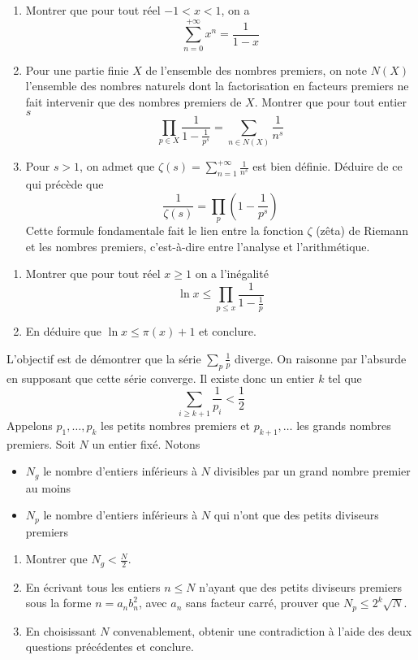 \begin{exo}
\begin{enumerate}
\item Montrer que pour tout réel $-1 < x < 1$, on a
$$\displaystyle\sum_{n=0}^{+\infty} x^n = \frac{1}{1-x}$$
\item Pour une partie finie $X$ de l'ensemble des nombres premiers, on note $N(X)$ l'ensemble des nombres naturels dont la factorisation en facteurs premiers ne fait intervenir que des nombres premiers de $X$. Montrer que pour tout entier $s$
$$\prod_{p \in X} \frac{1}{1-\frac{1}{p^s}} = \sum_{n \in N(X)} \frac{1}{n^s}$$
\item Pour $s > 1$, on admet que $\zeta(s) = \displaystyle\sum_{n=1}^{+\infty} \frac{1}{n^s}$ est bien définie. Déduire de ce qui précède que
$$\frac{1}{\zeta(s)} = \prod_{p} \left(1-\frac{1}{p^s}\right)$$
Cette formule fondamentale fait le lien entre la fonction $\zeta$ (\og zêta\fg{}) de Riemann et les nombres premiers, c'est-à-dire entre l'analyse et l'arithmétique.
\end{enumerate}
\end{exo}


\begin{exo}
\begin{enumerate}
\item Montrer que pour tout réel $x \geq 1$ on a l'inégalité
$$\ln x \leq \prod_{p \leq x} \frac{1}{1-\frac{1}{p}}$$
\item En déduire que $\ln x \leq \pi(x) + 1$ et conclure.
\end{enumerate}
\end{exo}


\begin{exo}[dû à Erd\H{o}]
L'objectif est de démontrer que la série $\displaystyle\sum_{p} \frac{1}{p}$ diverge. On raisonne par l'absurde en supposant que cette série converge. Il existe donc un entier $k$ tel que
\[ \sum_{i \geq k+1} \frac{1}{p_i} < \frac{1}{2} \]
Appelons $p_1, \dots, p_k$ les \og petits \fg{} nombres premiers et $p_{k+1}, \dots$ les \og grands \fg{} nombres premiers. Soit $N$ un entier fixé. Notons
\begin{itemize}
	\item $N_g$ le nombre d'entiers inférieurs à $N$ divisibles par un grand nombre premier au moins
	\item $N_p$ le nombre d'entiers inférieurs à $N$ qui n'ont que des petits diviseurs premiers
\end{itemize}
\begin{enumerate}
	\item Montrer que $N_g < \frac{N}{2}$.
	\item En écrivant tous les entiers $n \leq N$ n'ayant que des petits diviseurs premiers sous la forme $n = a_nb_n^2$, avec $a_n$ sans facteur carré, prouver que $N_p \leq 2^k \sqrt{N}$.
	\item En choisissant $N$ convenablement, obtenir une contradiction à l'aide des deux questions précédentes et conclure.
\end{enumerate}
\end{exo}


